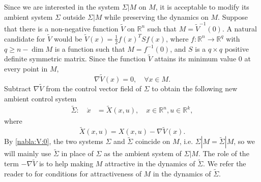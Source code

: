 \documentclass[letterpaper, 10 pt, conference]{ieeeconf}  %
\newcommand{\dimu}{{k}}
\begin{document}
Since we are interested in the system $\Sigma | M$ on $M$, it is acceptable to modify its ambient system  $\Sigma$ outside $\Sigma | M$ while preserving the dynamics on $M$. Suppose that there is a non-negative function $\tilde V$ on $\mathbb R^n$ such that $M = \tilde V^{-1}(0)$. A natural candidate for $\tilde V$ would be $\tilde V(x) = \frac{1}{2}f(x)^TSf(x)$, where $f: \mathbb R^n \rightarrow \mathbb R^q$ with $q \geq n -\dim M$ is a function such that $M = f^{-1}(0)$, and $S$ is a $q \times q$ positive definite symmetric matrix. Since the function $\tilde V$ attains its minimum value $0$ at every point in  $M$, 
\begin{equation}\label{nabla:V:0}
\nabla \tilde V(x) = 0, \quad \forall x \in M.
\end{equation}
Subtract $\nabla \tilde V$ from the control vector field of $\Sigma$ to obtain the following new ambient control system
\begin{align}\label{Sigma:tilde}
\tilde \Sigma: \quad \dot x& = \tilde X(x,u), \quad x \in \mathbb R^n, u \in \mathbb R^\dimu,
\end{align}
where
\[
\tilde X(x,u) =X(x,u) -\nabla \tilde V(x).
\]
By \eqref{nabla:V:0}, the two systems $\Sigma$ and $\tilde \Sigma$ coincide on $M$, i.e. $\Sigma | M = \tilde \Sigma | M$, so we will mainly use $\tilde \Sigma$ in place of $\Sigma$ as the ambient system of $\Sigma | M$.  The role of the term $-\nabla \tilde V$ is to help making $M$  attractive in the dynamics of $\tilde \Sigma$. We refer the reader   to \cite{ChJiPe16} for conditions for attractiveness of $M$  in the dynamics of $\tilde \Sigma$.
\end{document}
